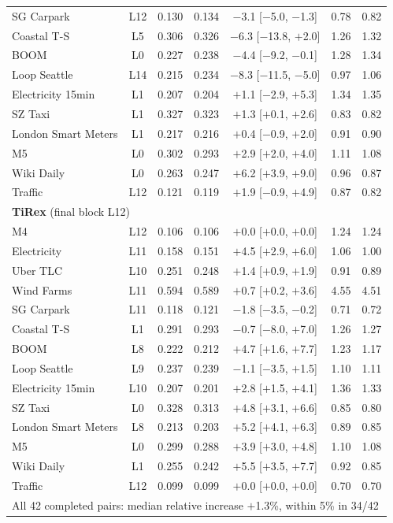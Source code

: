 \begin{tabular}{l c cc c cc}
SG Carpark & L12 & 0.130 & 0.134 & $-$3.1 [$-$5.0, $-$1.3] & 0.78 & 0.82 \\
Coastal T-S & L5 & 0.306 & 0.326 & $-$6.3 [$-$13.8, $+$2.0] & 1.26 & 1.32 \\
BOOM & L0 & 0.227 & 0.238 & $-$4.4 [$-$9.2, $-$0.1] & 1.28 & 1.34 \\
Loop Seattle & L14 & 0.215 & 0.234 & $-$8.3 [$-$11.5, $-$5.0] & 0.97 & 1.06 \\
Electricity 15min & L1 & 0.207 & 0.204 & $+$1.1 [$-$2.9, $+$5.3] & 1.34 & 1.35 \\
SZ Taxi & L1 & 0.327 & 0.323 & $+$1.3 [$+$0.1, $+$2.6] & 0.83 & 0.82 \\
London Smart Meters & L1 & 0.217 & 0.216 & $+$0.4 [$-$0.9, $+$2.0] & 0.91 & 0.90 \\
M5 & L0 & 0.302 & 0.293 & $+$2.9 [$+$2.0, $+$4.0] & 1.11 & 1.08 \\
Wiki Daily & L0 & 0.263 & 0.247 & $+$6.2 [$+$3.9, $+$9.0] & 0.96 & 0.87 \\
Traffic & L12 & 0.121 & 0.119 & $+$1.9 [$-$0.9, $+$4.9] & 0.87 & 0.82 \\
\midrule
\multicolumn{7}{l}{\textbf{TiRex} (final block L12)} \\
M4 & L12 & 0.106 & 0.106 & $+$0.0 [$+$0.0, $+$0.0] & 1.24 & 1.24 \\
Electricity & L11 & 0.158 & 0.151 & $+$4.5 [$+$2.9, $+$6.0] & 1.06 & 1.00 \\
Uber TLC & L10 & 0.251 & 0.248 & $+$1.4 [$+$0.9, $+$1.9] & 0.91 & 0.89 \\
Wind Farms & L11 & 0.594 & 0.589 & $+$0.7 [$+$0.2, $+$3.6] & 4.55 & 4.51 \\
SG Carpark & L11 & 0.118 & 0.121 & $-$1.8 [$-$3.5, $-$0.2] & 0.71 & 0.72 \\
Coastal T-S & L1 & 0.291 & 0.293 & $-$0.7 [$-$8.0, $+$7.0] & 1.26 & 1.27 \\
BOOM & L8 & 0.222 & 0.212 & $+$4.7 [$+$1.6, $+$7.7] & 1.23 & 1.17 \\
Loop Seattle & L9 & 0.237 & 0.239 & $-$1.1 [$-$3.5, $+$1.5] & 1.10 & 1.11 \\
Electricity 15min & L10 & 0.207 & 0.201 & $+$2.8 [$+$1.5, $+$4.1] & 1.36 & 1.33 \\
SZ Taxi & L0 & 0.328 & 0.313 & $+$4.8 [$+$3.1, $+$6.6] & 0.85 & 0.80 \\
London Smart Meters & L8 & 0.213 & 0.203 & $+$5.2 [$+$4.1, $+$6.3] & 0.89 & 0.85 \\
M5 & L0 & 0.299 & 0.288 & $+$3.9 [$+$3.0, $+$4.8] & 1.10 & 1.08 \\
Wiki Daily & L1 & 0.255 & 0.242 & $+$5.5 [$+$3.5, $+$7.7] & 0.92 & 0.85 \\
Traffic & L12 & 0.099 & 0.099 & $+$0.0 [$+$0.0, $+$0.0] & 0.70 & 0.70 \\
\midrule
\multicolumn{7}{l}{All 42 completed pairs: median relative increase $+$1.3\%, within 5\% in 34/42} \\
\bottomrule
\end{tabular}
